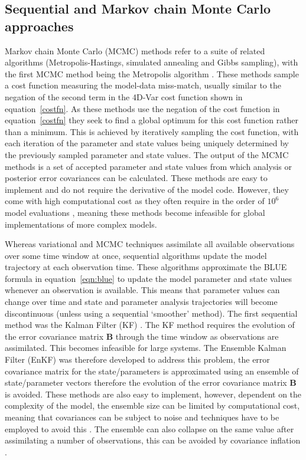 \documentclass[12pt]{article}
\begin{document}
\subsection{Sequential and Markov chain Monte Carlo approaches}

Markov chain Monte Carlo (MCMC) methods refer to a suite of related algorithms (Metropolis-Hastings, simulated annealing and Gibbs sampling), with the first MCMC method being the Metropolis algorithm \citep{metropolis1953equation}. These methods sample a cost function measuring the model-data miss-match, usually similar to the negation of the second term in the 4D-Var cost function shown in equation~\eqref{costfn}. As these methods use the negation of the cost function in equation~\eqref{costfn} they seek to find a global optimum for this cost function rather than a minimum. This is achieved by iteratively sampling the cost function, with each iteration of the parameter and state values being uniquely determined by the previously sampled parameter and state values. The output of the MCMC methods is a set of accepted parameter and state values from which analysis or posterior error covariances can be calculated. These methods are easy to implement and do not require the derivative of the model code. However, they come with high computational cost as they often require in the order of \(10^{6}\) model evaluations \citep{zobitz2011primer}, meaning these methods become infeasible for global implementations of more complex models. 

Whereas variational and MCMC techniques assimilate all available observations over some time window at once, sequential algorithms update the model trajectory at each observation time. These algorithms approximate the BLUE formula in equation~\eqref{eqn:blue} to update the model parameter and state values whenever an observation is available. This means that parameter values can change over time and state and parameter analysis trajectories will become discontinuous (unless using a sequential `smoother' method). The first sequential method was the Kalman Filter (KF) \citep{kalman1960}. The KF method requires the evolution of the error covariance matrix \textbf{B} through the time window as observations are assimilated. This becomes infeasible for large systems. The Ensemble Kalman Filter (EnKF) \citep{Evensen2003} was therefore developed to address this problem, the error covariance matrix for the state/parameters is approximated using an ensemble of state/parameter vectors therefore the evolution of the error covariance matrix \textbf{B} is avoided. These methods are also easy to implement, however, dependent on the complexity of the model, the ensemble size can be limited by computational cost, meaning that covariances can be subject to noise and techniques have to be employed to avoid this \citep{Hamill2001}. The ensemble can also collapse on the same value after assimilating a number of observations, this can be avoided by covariance inflation \citep{andersonandanderson1999}. 
\end{document}
